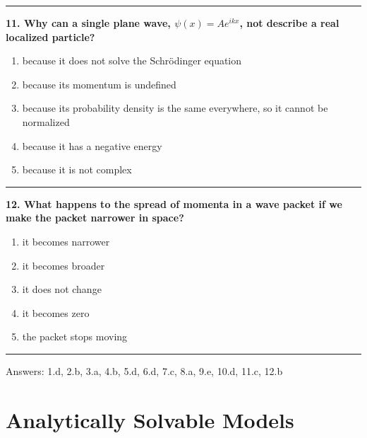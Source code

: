 \documentclass[
  english,
  9pt,
]{extbook}
\providecommand{\tightlist}{%
  \setlength{\itemsep}{0pt}\setlength{\parskip}{0pt}}
\theoremstyle{definition}
\theoremstyle{definition}
\theoremstyle{definition}
\theoremstyle{definition}
\theoremstyle{remark}
\begin{document}
\begin{center}\rule{0.5\linewidth}{0.5pt}\end{center}

\textbf{11. Why can a single plane wave, \(\psi(x)=Ae^{ikx}\), not describe a real localized particle?}

\begin{enumerate}
\def\labelenumi{\alph{enumi}.}
\tightlist
\item
  because it does not solve the Schrödinger equation\\
\item
  because its momentum is undefined\\
\item
  because its probability density is the same everywhere, so it cannot be normalized\\
\item
  because it has a negative energy\\
\item
  because it is not complex
\end{enumerate}

\begin{center}\rule{0.5\linewidth}{0.5pt}\end{center}

\textbf{12. What happens to the spread of momenta in a wave packet if we make the packet narrower in space?}

\begin{enumerate}
\def\labelenumi{\alph{enumi}.}
\tightlist
\item
  it becomes narrower\\
\item
  it becomes broader\\
\item
  it does not change\\
\item
  it becomes zero\\
\item
  the packet stops moving
\end{enumerate}

\begin{center}\rule{0.5\linewidth}{0.5pt}\end{center}

Answers: 1.d, 2.b, 3.a, 4.b, 5.d, 6.d, 7.c, 8.a, 9.e, 10.d, 11.c, 12.b

\chapter{Analytically Solvable Models}\label{Models}
\end{document}

